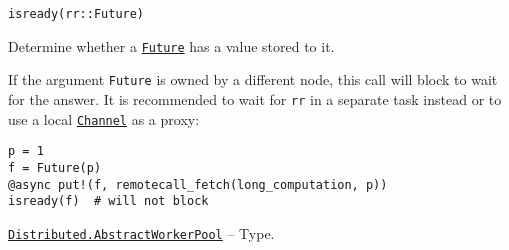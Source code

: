 \begin{adjustwidth}{2em}{0pt}


\begin{verbatim}
isready(rr::Future)
\end{verbatim}

Determine whether a \hyperlink{4170271048165085864}{\texttt{Future}} has a value stored to it.

If the argument \texttt{Future} is owned by a different node, this call will block to wait for the answer. It is recommended to wait for \texttt{rr} in a separate task instead or to use a local \hyperlink{12548845729684045604}{\texttt{Channel}} as a proxy:


\begin{verbatim}
p = 1
f = Future(p)
@async put!(f, remotecall_fetch(long_computation, p))
isready(f)  # will not block
\end{verbatim}



\end{adjustwidth}
\hypertarget{3164386881139700111}{}
\hyperlink{3164386881139700111}{\texttt{Distributed.AbstractWorkerPool}}  -- {Type.}

